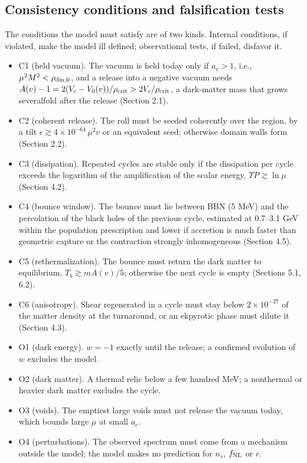 \documentclass[pdflatex,sn-mathphys-num]{sn-jnl}
\begin{document}
\subsection{Consistency conditions and falsification tests}
The conditions the model must satisfy are of two kinds. Internal conditions, if violated, make the model ill defined; observational tests, if failed, disfavor it.

\begin{itemize}\item C1 (held vacuum). The vacuum is held today only if $a_c>1$, i.e., $\mu^2M^2<\rho_{\rm dm,0}$, and a release into a negative vacuum needs $A(v)-1=2(V_c-V_0(v))/\rho_{\rm crit}>2V_c/\rho_{\rm crit}$, a dark-matter mass that grows severalfold after the release (Section 2.1).
\item C2 (coherent release). The roll must be seeded coherently over the region, by a tilt $\epsilon\gtrsim4\times10^{-64}\,\mu^2v$ or an equivalent seed; otherwise domain walls form (Section 2.2).
\item C3 (dissipation). Repeated cycles are stable only if the dissipation per cycle exceeds the logarithm of the amplification of the scalar energy, $\Upsilon P\gtrsim\ln\mu$ (Section 4.2).
\item C4 (bounce window). The bounce must lie between BBN (5 MeV) and the percolation of the black holes of the previous cycle, estimated at 0.7--3.1 GeV within the population prescription and lower if accretion is much faster than geometric capture or the contraction strongly inhomogeneous (Section 4.5).
\item C5 (rethermalization). The bounce must return the dark matter to equilibrium, $T_b\gtrsim mA(v)/5$; otherwise the next cycle is empty (Sections 5.1, 6.2).
\item C6 (anisotropy). Shear regenerated in a cycle must stay below $2\times10^{-27}$ of the matter density at the turnaround, or an ekpyrotic phase must dilute it (Section 4.3).
\item O1 (dark energy). $w=-1$ exactly until the release; a confirmed evolution of $w$ excludes the model.
\item O2 (dark matter). A thermal relic below a few hundred MeV; a nonthermal or heavier dark matter excludes the cycle.
\item O3 (voids). The emptiest large voids must not release the vacuum today, which bounds large $\mu$ at small $a_c$.
\item O4 (perturbations). The observed spectrum must come from a mechanism outside the model; the model makes no prediction for $n_s$, $f_{\rm NL}$ or $r$.
\end{itemize}
\end{document}
